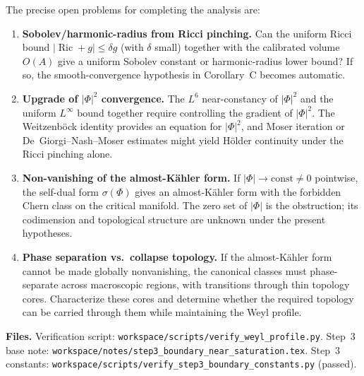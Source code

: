 The precise open problems for completing the analysis are:
\begin{enumerate}
\item \textbf{Sobolev/harmonic-radius from Ricci pinching.}
  Can the uniform Ricci bound \(|\operatorname{Ric}+g|\le\delta g\)
  (with \(\delta\) small) together with the calibrated volume \(O(A)\)
  give a uniform Sobolev constant or harmonic-radius lower bound?
  If so, the smooth-convergence hypothesis in Corollary~C becomes
  automatic.
\item \textbf{Upgrade of \(|\Phi|^2\) convergence.}
  The \(L^6\) near-constancy of \(|\Phi|^2\) and the uniform \(L^\infty\)
  bound together require controlling the gradient of \(|\Phi|^2\).  The
  Weitzenb\"ock identity provides an equation for \(|\Phi|^2\), and
  Moser iteration or De~Giorgi--Nash--Moser estimates might yield
  H\"older continuity under the Ricci pinching alone.
\item \textbf{Non-vanishing of the almost-K\"ahler form.}
  If \(|\Phi|\to\text{const}\ne0\) pointwise, the self-dual form
  \(\sigma(\Phi)\) gives an almost-K\"ahler form with the forbidden
  Chern class on the critical manifold.  The zero set of \(|\Phi|\) is
  the obstruction; its codimension and topological structure are unknown
  under the present hypotheses.
\item \textbf{Phase separation vs.\ collapse topology.}
  If the almost-K\"ahler form cannot be made globally nonvanishing,
  the canonical classes must phase-separate across macroscopic regions,
  with transitions through thin topology cores.  Characterize these
  cores and determine whether the required topology can be carried
  through them while maintaining the Weyl profile.
\end{enumerate}

\medskip
\noindent\textbf{Files.}
Verification script:
\texttt{workspace/scripts/verify\_weyl\_profile.py}.
Step~3 base note:
\texttt{workspace/notes/step3\_boundary\_near\_saturation.tex}.
Step~3 constants:
\texttt{workspace/scripts/verify\_step3\_boundary\_constants.py} (passed).
